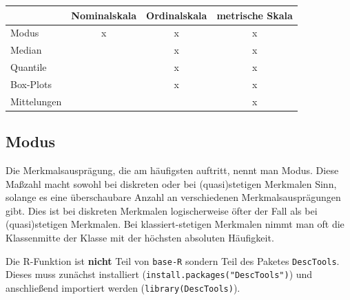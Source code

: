 \documentclass[a4paper]{article}
\newcommand\dangersign{%
 \makebox[1.8em][c]{%
 \makebox[0pt][c]{\raisebox{.15em}{\small!}}%
 \makebox[0pt][c]{\color{red}\Large$\triangle$}}}%
\begin{document}
\begin{center}
 \begin{tabular}{|l c c c|} 
 \hline
 & Nominalskala & Ordinalskala& metrische Skala\\
 \hline\hline
 Modus &x & x & x \\ 
 \hline
 Median &  & x & x \\
 \hline
 Quantile &  & x & x \\
 \hline
 Box-Plots &  & x & x \\
 \hline
Mittelungen &  &  & x \\
 \hline
\end{tabular}
\end{center}

\subsection{Modus}
Die Merkmalsausprägung, die am häufigsten auftritt, nennt man Modus. Diese Maßzahl macht sowohl bei diskreten oder bei (quasi)stetigen Merkmalen Sinn, solange es eine überschaubare Anzahl an verschiedenen Merkmalsausprägungen gibt. Dies ist bei diskreten Merkmalen logischerweise öfter der Fall als bei (quasi)stetigen Merkmalen. Bei klassiert-stetigen Merkmalen nimmt man oft die Klassenmitte der Klasse mit der höchsten absoluten Häufigkeit.\\

\noindent {}

\noindent \dangersign Die R-Funktion ist \textbf{nicht} Teil von \texttt{base-R} sondern Teil des Paketes \texttt{DescTools}. Dieses muss zunächst installiert (\texttt{install.packages("DescTools")}) und anschließend importiert werden (\texttt{library(DescTools)}).
\end{document}
